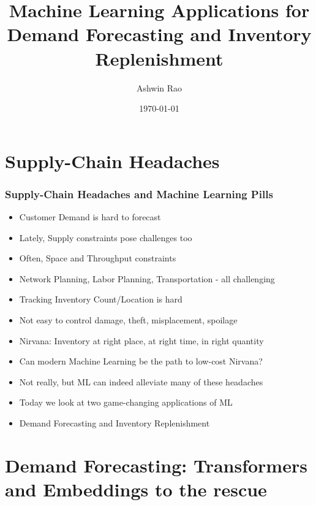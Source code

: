 \documentclass[handout]{beamer}
\title[ML for Forecasting and Replenishment]{Machine Learning Applications for \\ Demand Forecasting and Inventory Replenishment} %
\author{Ashwin Rao} %
\institute[Wayfair/Stanford] %
{
Chief Science Officer @ Wayfair and Adjunct Professor @ Stanford University
}
\date{\today} %
\begin{document}
\begin{frame}
\titlepage %
\end{frame}

\tableofcontents

\section{Supply-Chain Headaches}

\begin{frame}
\frametitle{Supply-Chain Headaches and Machine Learning Pills}
\pause
\begin{itemize}[<+->]
\item Customer Demand is hard to forecast
\item Lately, Supply constraints pose challenges too
\item Often, Space and Throughput constraints
\item Network Planning, Labor Planning, Transportation - all challenging
\item Tracking Inventory Count/Location is hard
\item Not easy to control damage, theft, misplacement, spoilage
\item Nirvana: Inventory at right place, at right time, in right quantity
\item Can modern Machine Learning be the path to low-cost Nirvana?
\item Not really, but ML can indeed alleviate many of these headaches
\item Today we look at two game-changing applications of ML
\item Demand Forecasting and Inventory Replenishment
\end{itemize}
\end{frame}

\section{Demand Forecasting: Transformers and Embeddings to the rescue}
\end{document}

